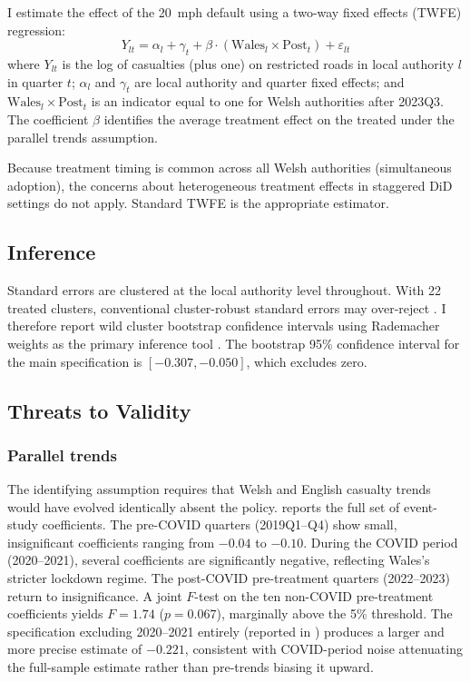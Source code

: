 \documentclass[12pt]{article}
\begin{document}
I estimate the effect of the 20~mph default using a two-way fixed effects (TWFE) regression:
\begin{equation}
\label{eq:did}
Y_{lt} = \alpha_l + \gamma_t + \beta \cdot (\text{Wales}_l \times \text{Post}_t) + \varepsilon_{lt}
\end{equation}
where $Y_{lt}$ is the log of casualties (plus one) on restricted roads in local authority $l$ in quarter $t$; $\alpha_l$ and $\gamma_t$ are local authority and quarter fixed effects; and $\text{Wales}_l \times \text{Post}_t$ is an indicator equal to one for Welsh authorities after 2023Q3. The coefficient $\beta$ identifies the average treatment effect on the treated under the parallel trends assumption.

Because treatment timing is common across all Welsh authorities (simultaneous adoption), the concerns about heterogeneous treatment effects in staggered DiD settings \citep{goodman2021} do not apply. Standard TWFE is the appropriate estimator.

\subsection{Inference}

Standard errors are clustered at the local authority level throughout. With 22 treated clusters, conventional cluster-robust standard errors may over-reject \citep{bertrand2004, cameron2008}. I therefore report wild cluster bootstrap confidence intervals using Rademacher weights as the primary inference tool \citep{cameron2008}. The bootstrap 95\% confidence interval for the main specification is $[-0.307, -0.050]$, which excludes zero.

\subsection{Threats to Validity}

\subsubsection*{Parallel trends} The identifying assumption requires that Welsh and English casualty trends would have evolved identically absent the policy.  reports the full set of event-study coefficients. The pre-COVID quarters (2019Q1--Q4) show small, insignificant coefficients ranging from $-0.04$ to $-0.10$. During the COVID period (2020--2021), several coefficients are significantly negative, reflecting Wales's stricter lockdown regime. The post-COVID pre-treatment quarters (2022--2023) return to insignificance. A joint $F$-test on the ten non-COVID pre-treatment coefficients yields $F = 1.74$ ($p = 0.067$), marginally above the 5\% threshold. The specification excluding 2020--2021 entirely (reported in ) produces a larger and more precise estimate of $-0.221$, consistent with COVID-period noise attenuating the full-sample estimate rather than pre-trends biasing it upward.
\end{document}
